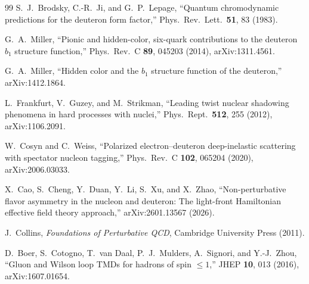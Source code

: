 \documentclass[11pt]{article}
\begin{document}
\begin{thebibliography}{99}
S.~J.~Brodsky, C.-R.~Ji, and G.~P.~Lepage,
``Quantum chromodynamic predictions for the deuteron form factor,''
Phys.\ Rev.\ Lett.\ \textbf{51}, 83 (1983).

G.~A.~Miller,
``Pionic and hidden-color, six-quark contributions to the deuteron \(b_1\) structure function,''
Phys.\ Rev.\ C \textbf{89}, 045203 (2014), arXiv:1311.4561.

G.~A.~Miller,
``Hidden color and the \(b_1\) structure function of the deuteron,''
arXiv:1412.1864.

L.~Frankfurt, V.~Guzey, and M.~Strikman,
``Leading twist nuclear shadowing phenomena in hard processes with nuclei,''
Phys.\ Rept.\ \textbf{512}, 255 (2012), arXiv:1106.2091.

W.~Cosyn and C.~Weiss,
``Polarized electron--deuteron deep-inelastic scattering with spectator nucleon tagging,''
Phys.\ Rev.\ C \textbf{102}, 065204 (2020), arXiv:2006.03033.

X.~Cao, S.~Cheng, Y.~Duan, Y.~Li, S.~Xu, and X.~Zhao,
``Non-perturbative flavor asymmetry in the nucleon and deuteron: The light-front Hamiltonian effective field theory approach,''
arXiv:2601.13567 (2026).

J.~Collins,
\emph{Foundations of Perturbative QCD},
Cambridge University Press (2011).

D.~Boer, S.~Cotogno, T.~van Daal, P.~J.~Mulders, A.~Signori, and Y.-J.~Zhou,
``Gluon and Wilson loop TMDs for hadrons of spin \(\leq1\),''
JHEP \textbf{10}, 013 (2016), arXiv:1607.01654.

\end{thebibliography}
\end{document}
